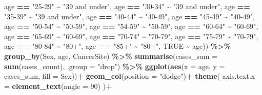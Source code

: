 \documentclass[
]{article}
\newenvironment{Shaded}{\begin{snugshade}}{\end{snugshade}}
\newcommand{\AttributeTok}[1]{\textcolor[rgb]{0.13,0.29,0.53}{#1}}
\newcommand{\ConstantTok}[1]{\textcolor[rgb]{0.56,0.35,0.01}{#1}}
\newcommand{\DecValTok}[1]{\textcolor[rgb]{0.00,0.00,0.81}{#1}}
\newcommand{\FunctionTok}[1]{\textcolor[rgb]{0.13,0.29,0.53}{\textbf{#1}}}
\newcommand{\NormalTok}[1]{#1}
\newcommand{\SpecialCharTok}[1]{\textcolor[rgb]{0.81,0.36,0.00}{\textbf{#1}}}
\newcommand{\StringTok}[1]{\textcolor[rgb]{0.31,0.60,0.02}{#1}}
\begin{document}
\begin{Shaded}
\begin{Highlighting}[]
\NormalTok{   age }\SpecialCharTok{==} \StringTok{"25{-}29"} \SpecialCharTok{\textasciitilde{}} \StringTok{"39 and under"}\NormalTok{,}
\NormalTok{   age }\SpecialCharTok{==} \StringTok{"30{-}34"} \SpecialCharTok{\textasciitilde{}} \StringTok{"39 and under"}\NormalTok{,}
\NormalTok{   age }\SpecialCharTok{==} \StringTok{"35{-}39"} \SpecialCharTok{\textasciitilde{}} \StringTok{"39 and under"}\NormalTok{,}
\NormalTok{   age }\SpecialCharTok{==} \StringTok{"40{-}44"} \SpecialCharTok{\textasciitilde{}} \StringTok{"40{-}49"}\NormalTok{,}
\NormalTok{   age }\SpecialCharTok{==} \StringTok{"45{-}49"} \SpecialCharTok{\textasciitilde{}} \StringTok{"40{-}49"}\NormalTok{,}
\NormalTok{   age }\SpecialCharTok{==} \StringTok{"50{-}54"} \SpecialCharTok{\textasciitilde{}} \StringTok{"50{-}59"}\NormalTok{,}
\NormalTok{   age }\SpecialCharTok{==} \StringTok{"54{-}59"} \SpecialCharTok{\textasciitilde{}} \StringTok{"50{-}59"}\NormalTok{,}
\NormalTok{   age }\SpecialCharTok{==} \StringTok{"60{-}64"} \SpecialCharTok{\textasciitilde{}} \StringTok{"60{-}69"}\NormalTok{,}
\NormalTok{   age }\SpecialCharTok{==} \StringTok{"65{-}69"} \SpecialCharTok{\textasciitilde{}} \StringTok{"60{-}69"}\NormalTok{,}
\NormalTok{   age }\SpecialCharTok{==} \StringTok{"70{-}74"} \SpecialCharTok{\textasciitilde{}} \StringTok{"70{-}79"}\NormalTok{,}
\NormalTok{   age }\SpecialCharTok{==} \StringTok{"75{-}79"} \SpecialCharTok{\textasciitilde{}} \StringTok{"70{-}79"}\NormalTok{,}
\NormalTok{   age }\SpecialCharTok{==} \StringTok{"80{-}84"} \SpecialCharTok{\textasciitilde{}} \StringTok{"80+"}\NormalTok{,}
\NormalTok{   age }\SpecialCharTok{==} \StringTok{"85+"} \SpecialCharTok{\textasciitilde{}} \StringTok{"80+"}\NormalTok{,}
   \ConstantTok{TRUE} \SpecialCharTok{\textasciitilde{}}\NormalTok{ age)) }\SpecialCharTok{\%\textgreater{}\%}
  \FunctionTok{group\_by}\NormalTok{(Sex, age, CancerSite) }\SpecialCharTok{\%\textgreater{}\%} 
  \FunctionTok{summarise}\NormalTok{(}\AttributeTok{cases\_sum =} \FunctionTok{sum}\NormalTok{(cases\_count), }\AttributeTok{.group =} \StringTok{"drop"}\NormalTok{) }\SpecialCharTok{\%\textgreater{}\%}
  \FunctionTok{ggplot}\NormalTok{(}\FunctionTok{aes}\NormalTok{(}\AttributeTok{x =}\NormalTok{ age, }\AttributeTok{y =}\NormalTok{ cases\_sum, }\AttributeTok{fill =}\NormalTok{ Sex))}\SpecialCharTok{+}
  \FunctionTok{geom\_col}\NormalTok{(}\AttributeTok{position =} \StringTok{"dodge"}\NormalTok{)}\SpecialCharTok{+}
  \FunctionTok{theme}\NormalTok{(}
    \AttributeTok{axis.text.x =} \FunctionTok{element\_text}\NormalTok{(}\AttributeTok{angle =} \DecValTok{90}\NormalTok{)}
\NormalTok{  )}\SpecialCharTok{+}

\end{Highlighting}
\end{Shaded}
\end{document}
